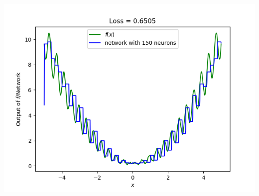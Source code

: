 \documentclass[11pt]{beamer}
\begin{document}
\begin{frame}[t]
\begin{center}
\includegraphics[scale=0.28]{50IntervalApprox.png}
\end{center}
\end{frame}
\end{document}
